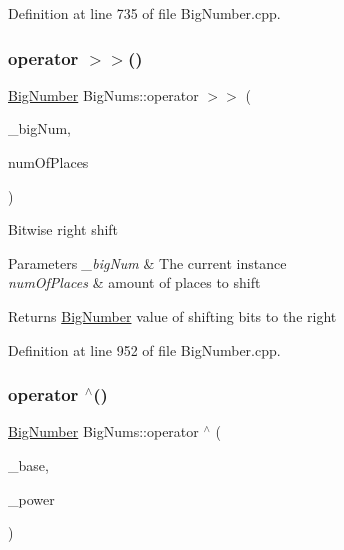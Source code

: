 Definition at line 735 of file Big\+Number.\+cpp.

\mbox{\label{namespace_big_nums_a461540d97b6da48dc4f771ab6c41a5f9}} 
\subsubsection{\texorpdfstring{operator $>$$>$()}{operator >>()}\hspace{0.1cm}{\footnotesize\ttfamily [2/2]}}
{\footnotesize\ttfamily \mbox{\hyperlink{class_big_nums_1_1_big_number}{Big\+Number}} Big\+Nums\+::operator $>$$>$ (\begin{DoxyParamCaption}\item[{const \mbox{\hyperlink{class_big_nums_1_1_big_number}{Big\+Number}} \&}]{\+\_\+big\+Num,  }\item[{int}]{num\+Of\+Places }\end{DoxyParamCaption})}

Bitwise right shift 
\begin{DoxyParams}{Parameters}
{\em \+\_\+big\+Num} & The current instance \\
\hline
{\em num\+Of\+Places} & amount of places to shift \\
\hline
\end{DoxyParams}
\begin{DoxyReturn}{Returns}
\mbox{\hyperlink{class_big_nums_1_1_big_number}{Big\+Number}} value of shifting bits to the right 
\end{DoxyReturn}


Definition at line 952 of file Big\+Number.\+cpp.

\mbox{\label{namespace_big_nums_a26f4f7080ee4ac682138c92ad0ce7f75}} 
\subsubsection{\texorpdfstring{operator $^\wedge$()}{operator ^()}\hspace{0.1cm}{\footnotesize\ttfamily [1/2]}}
{\footnotesize\ttfamily \mbox{\hyperlink{class_big_nums_1_1_big_number}{Big\+Number}} Big\+Nums\+::operator $^\wedge$ (\begin{DoxyParamCaption}\item[{\mbox{\hyperlink{class_big_nums_1_1_big_number}{Big\+Number}}}]{\+\_\+base,  }\item[{int}]{\+\_\+power }\end{DoxyParamCaption})}


